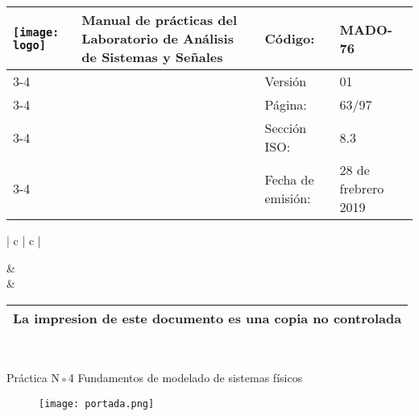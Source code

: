 
	\centering
	\begin{tabular}{ |	p{30 mm}|	p{61 mm}	|	p{33mm}	| p{43mm}	| } 
		\hline
		
		
		\multirow{4}{30mm}{\centering \texttt{[image: logo]}} &
		\multirow{4}{61mm}{\centering \textbf{ \textbf{Manual de prácticas del Laboratorio de Análisis de Sistemas y Señales}}}    & Código: & MADO-76 \\
		\cline{3-4}
		& &  Versión & 01 \\
		\cline{3-4}
		& & Página: & 63/97 \\ \cline{3-4}
		& & Sección ISO: & 8.3 \\ \cline{3-4}
		& & Fecha de emisión: & 28 de frebrero 2019 \\
		\hline
	\end{tabular}
\begin{tabular}{ |	c |	c	| } 
	
	 &
	   \\
	& \\ \hline
\end{tabular}
\begin{tabular}{|p{180mm}|}
	\multirow{1}{180mm}{ \centering La impresion de este documento es una copia no controlada }  \\ \hline \end{tabular} \\

\vspace{1cm}


{\centering \LARGE Práctica N◦4 Fundamentos de modelado de sistemas físicos}

\vspace{1.5cm}

\begin{figure}[!h]
	\centering
	\texttt{[image: portada.png]}
\end{figure}

\hspace{2cm}

